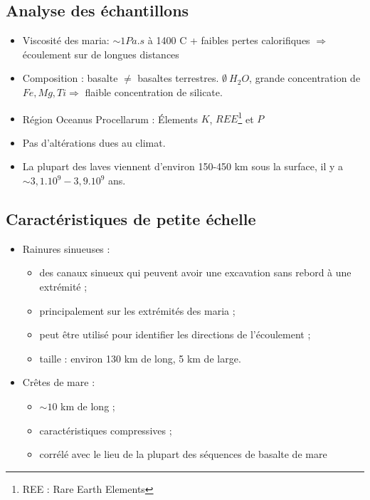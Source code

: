 \documentclass[10pt,a4paper, twocolumns]{article}
\begin{document}
\subsection{Analyse des échantillons}
	\begin{itemize}
		\item Viscosité des maria: $\sim 1 Pa.s$ à 1400 \degree C + faibles pertes calorifiques $\Rightarrow$ écoulement sur de longues distances
		\item Composition : basalte $\neq$ basaltes terrestres. $\emptyset\ H_2O$, grande concentration de $Fe, Mg, Ti \Rightarrow$ flaible concentration de silicate.
		\item Région Oceanus Procellarum : Élements $K$, $REE$\footnote{REE : Rare Earth Elements} et $P$
		\item Pas d'altérations dues au climat.
		\item La plupart des laves viennent d'environ 150-450 km sous la surface, il y a $\sim 3,1.10^9-3,9.10^9$ ans.
	\end{itemize}
	
\subsection{Caractéristiques de petite échelle}

	\begin{itemize}
		\item Rainures sinueuses :
		\begin{itemize}
			\item des canaux sinueux qui peuvent avoir une excavation sans rebord à une extrémité ;
			\item principalement sur les extrémités des maria ;
			\item peut être utilisé pour identifier les directions de l'écoulement ;
			\item taille : environ 130 km de long, 5 km de large.
		\end{itemize}
		\item Crêtes de mare :
		\begin{itemize}
			\item $\sim 10$ km de long ;
			\item caractéristiques compressives ;
			\item corrélé avec le lieu de la plupart des séquences de basalte de mare
		\end{itemize}
	\end{itemize}
	
\end{document}
